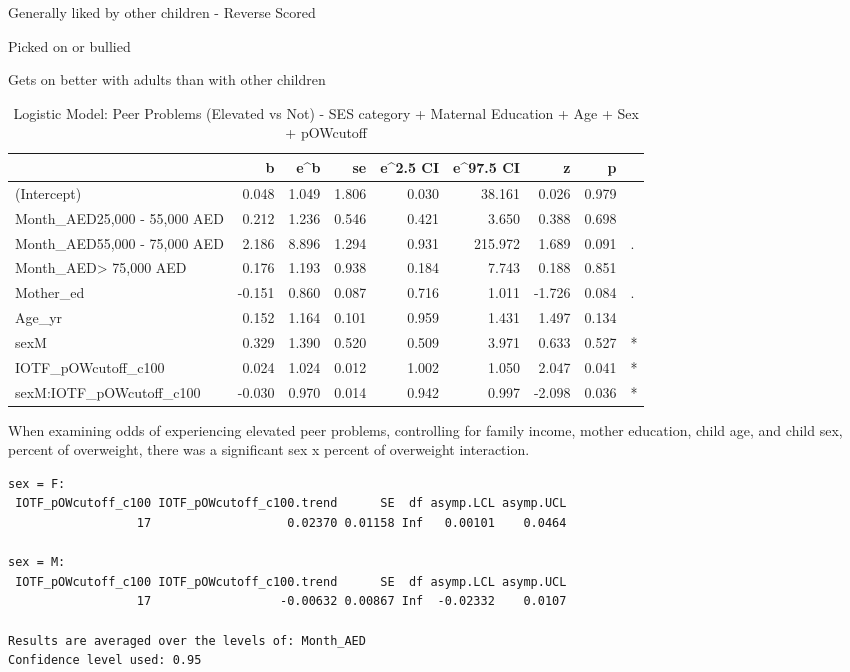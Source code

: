 \documentclass[
]{article}
\begin{document}
Generally liked by other children - Reverse Scored

Picked on or bullied

Gets on better with adults than with other children

\FloatBarrier

\begin{table}[!h]

\caption{\label{tab:IOTF_pOWcutoff_peerprobs_elevated_logit}Logistic Model: Peer Problems (Elevated vs Not) - SES category + Maternal Education + Age + Sex + pOWcutoff}
\centering
\begin{tabular}[t]{lrrrrrrrl}
\toprule
  & b & e\textasciicircum{}b & se & e\textasciicircum{}2.5 CI & e\textasciicircum{}97.5 CI & z & p &  \\
\midrule
(Intercept) & 0.048 & 1.049 & 1.806 & 0.030 & 38.161 & 0.026 & 0.979 & \\
Month\_AED25,000 - 55,000 AED & 0.212 & 1.236 & 0.546 & 0.421 & 3.650 & 0.388 & 0.698 & \\
Month\_AED55,000 - 75,000 AED & 2.186 & 8.896 & 1.294 & 0.931 & 215.972 & 1.689 & 0.091 & .\\
Month\_AED> 75,000 AED & 0.176 & 1.193 & 0.938 & 0.184 & 7.743 & 0.188 & 0.851 & \\
Mother\_ed & -0.151 & 0.860 & 0.087 & 0.716 & 1.011 & -1.726 & 0.084 & .\\
\addlinespace
Age\_yr & 0.152 & 1.164 & 0.101 & 0.959 & 1.431 & 1.497 & 0.134 & \\
sexM & 0.329 & 1.390 & 0.520 & 0.509 & 3.971 & 0.633 & 0.527 & *\\
IOTF\_pOWcutoff\_c100 & 0.024 & 1.024 & 0.012 & 1.002 & 1.050 & 2.047 & 0.041 & *\\
sexM:IOTF\_pOWcutoff\_c100 & -0.030 & 0.970 & 0.014 & 0.942 & 0.997 & -2.098 & 0.036 & *\\
\bottomrule
\end{tabular}
\end{table}

When examining odds of experiencing elevated peer problems, controlling
for family income, mother education, child age, and child sex, percent
of overweight, there was a significant sex x percent of overweight
interaction.

\FloatBarrier

\begin{verbatim}
sex = F:
 IOTF_pOWcutoff_c100 IOTF_pOWcutoff_c100.trend      SE  df asymp.LCL asymp.UCL
                  17                   0.02370 0.01158 Inf   0.00101    0.0464

sex = M:
 IOTF_pOWcutoff_c100 IOTF_pOWcutoff_c100.trend      SE  df asymp.LCL asymp.UCL
                  17                  -0.00632 0.00867 Inf  -0.02332    0.0107

Results are averaged over the levels of: Month_AED 
Confidence level used: 0.95 
\end{verbatim}
\end{document}
